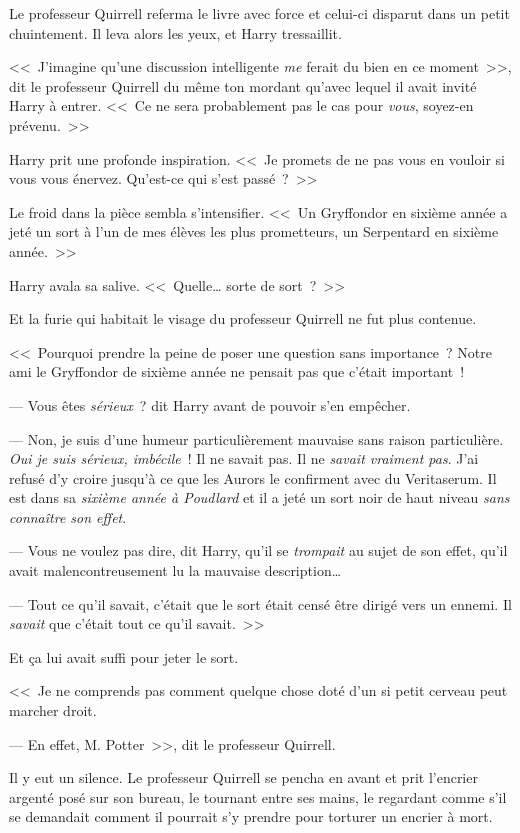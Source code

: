 Le professeur Quirrell referma le livre avec force et celui-ci disparut dans un petit chuintement. Il leva alors les yeux, et Harry tressaillit.

<<~J'imagine qu'une discussion intelligente \emph{me} ferait du bien en ce moment~>>, dit le professeur Quirrell du même ton mordant qu'avec lequel il avait invité Harry à entrer. <<~Ce ne sera probablement pas le cas pour \emph{vous}, soyez-en prévenu.~>>

Harry prit une profonde inspiration. <<~Je promets de ne pas vous en vouloir si vous vous énervez. Qu'est-ce qui s'est passé~?~>>

Le froid dans la pièce sembla s'intensifier. <<~Un Gryffondor en sixième année a jeté un sort à l'un de mes élèves les plus prometteurs, un Serpentard en sixième année.~>>

Harry avala sa salive. <<~Quelle… sorte de sort~?~>>

Et la furie qui habitait le visage du professeur Quirrell ne fut plus contenue.

<<~Pourquoi prendre la peine de poser une question sans importance~? Notre ami le Gryffondor de sixième année ne pensait pas que c'était important~!

--- Vous êtes \emph{sérieux}~? dit Harry avant de pouvoir s'en empêcher.

--- Non, je suis d'une humeur particulièrement mauvaise sans raison particulière. \emph{Oui je suis sérieux, imbécile}~! Il ne savait pas. Il ne \emph{savait vraiment pas}. J'ai refusé d'y croire jusqu'à ce que les Aurors le confirment avec du Veritaserum. Il est dans sa \emph{sixième année à Poudlard} et il a jeté un sort noir de haut niveau \emph{sans connaître son effet}.

--- Vous ne voulez pas dire, dit Harry, qu'il se \emph{trompait} au sujet de son effet, qu'il avait malencontreusement lu la mauvaise description…

--- Tout ce qu'il savait, c'était que le sort était censé être dirigé vers un ennemi. Il \emph{savait} que c'était tout ce qu'il savait.~>>

Et ça lui avait suffi pour jeter le sort.

<<~Je ne comprends pas comment quelque chose doté d'un si petit cerveau peut marcher droit.

--- En effet, M. Potter~>>, dit le professeur Quirrell.

Il y eut un silence. Le professeur Quirrell se pencha en avant et prit l'encrier argenté posé sur son bureau, le tournant entre ses mains, le regardant comme s'il se demandait comment il pourrait s'y prendre pour torturer un encrier à mort.

